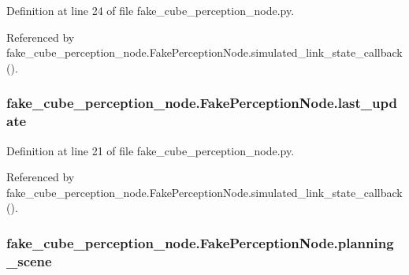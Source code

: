 Definition at line 24 of file fake\+\_\+cube\+\_\+perception\+\_\+node.\+py.



Referenced by fake\+\_\+cube\+\_\+perception\+\_\+node.\+Fake\+Perception\+Node.\+simulated\+\_\+link\+\_\+state\+\_\+callback().

\subsubsection[{\texorpdfstring{last\+\_\+update}{last_update}}]{\setlength{\rightskip}{0pt plus 5cm}fake\+\_\+cube\+\_\+perception\+\_\+node.\+Fake\+Perception\+Node.\+last\+\_\+update}\hypertarget{classfake__cube__perception__node_1_1FakePerceptionNode_a2f5f0b4e0a1483187b2a84552df7edc1}{}\label{classfake__cube__perception__node_1_1FakePerceptionNode_a2f5f0b4e0a1483187b2a84552df7edc1}


Definition at line 21 of file fake\+\_\+cube\+\_\+perception\+\_\+node.\+py.



Referenced by fake\+\_\+cube\+\_\+perception\+\_\+node.\+Fake\+Perception\+Node.\+simulated\+\_\+link\+\_\+state\+\_\+callback().

\subsubsection[{\texorpdfstring{planning\+\_\+scene}{planning_scene}}]{\setlength{\rightskip}{0pt plus 5cm}fake\+\_\+cube\+\_\+perception\+\_\+node.\+Fake\+Perception\+Node.\+planning\+\_\+scene}\hypertarget{classfake__cube__perception__node_1_1FakePerceptionNode_a9385fd4c339eeaf1ca269ef9e314bb09}{}\label{classfake__cube__perception__node_1_1FakePerceptionNode_a9385fd4c339eeaf1ca269ef9e314bb09}


